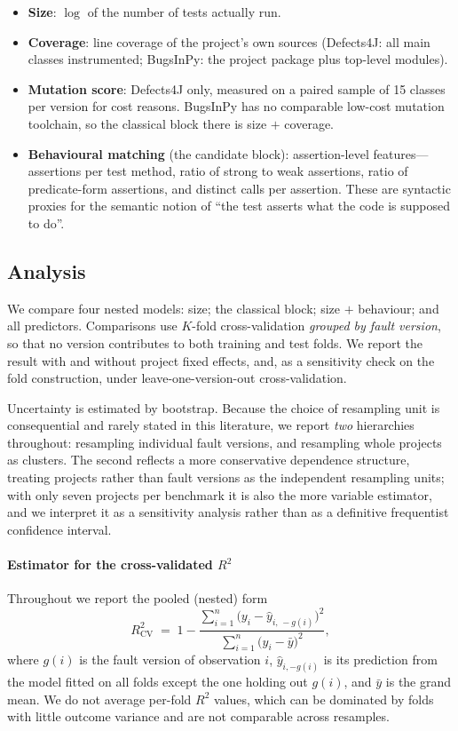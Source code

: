 \documentclass[preprint,12pt]{elsarticle}
\begin{document}
\begin{itemize}
\item \textbf{Size}: $\log$ of the number of tests actually run.
\item \textbf{Coverage}: line coverage of the project's own sources
(Defects4J: all main classes instrumented; BugsInPy: the project package
plus top-level modules).
\item \textbf{Mutation score}: Defects4J only, measured on a paired sample
of \num{15} classes per version for cost reasons. BugsInPy has no
comparable low-cost mutation toolchain, so the classical block there is
size $+$ coverage.
\item \textbf{Behavioural matching} (the candidate block): assertion-level
features---assertions per test method, ratio of strong to weak assertions,
ratio of predicate-form assertions, and distinct calls per assertion. These
are syntactic proxies for the semantic notion of ``the test asserts what
the code is supposed to do''.
\end{itemize}

\subsection{Analysis}

We compare four nested models: size; the classical block; size $+$
behaviour; and all predictors. Comparisons use $K$-fold cross-validation
\emph{grouped by fault version}, so that no version contributes to both
training and test folds. We report the result with and without project
fixed effects, and, as a sensitivity check on the fold construction, under
leave-one-version-out cross-validation.

Uncertainty is estimated by bootstrap. Because the choice of resampling
unit is consequential and rarely stated in this literature, we report
\emph{two} hierarchies throughout: resampling individual fault versions,
and resampling whole projects as clusters. The second reflects a more conservative dependence structure, treating projects rather than fault versions as the independent resampling units; with only seven projects per benchmark it is also the more variable estimator, and we interpret it as a sensitivity analysis rather than as a definitive frequentist confidence interval.

\paragraph{Estimator for the cross-validated $R^2$} Throughout we report
the pooled (nested) form
\begin{equation}
R^2_{\mathrm{CV}} \;=\;
1 - \frac{\sum_{i=1}^{n}\bigl(y_i - \hat{y}_{i,\,-g(i)}\bigr)^2}
        {\sum_{i=1}^{n}\bigl(y_i - \bar{y}\bigr)^2},
\end{equation}
where $g(i)$ is the fault version of observation $i$,
$\hat{y}_{i,-g(i)}$ is its prediction from the model fitted on all folds
except the one holding out $g(i)$, and $\bar{y}$ is the grand mean. We do
not average per-fold $R^2$ values, which can be dominated by folds with
little outcome variance and are not comparable across resamples.
\end{document}
